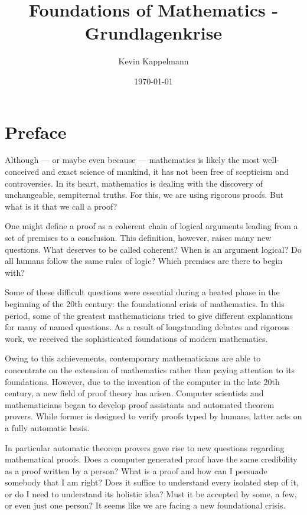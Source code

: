\documentclass[hidelinks]{article}
\title{\textbf{Foundations of Mathematics - Grundlagenkrise}}
\author{Kevin Kappelmann}
\affil{Chair for Logic and Verification,\\ Technical University of Munich}
\date{\today}
\theoremstyle{plain}
\theoremstyle{definition}
\theoremstyle{rem}
\begin{document}

\maketitle
\newpage
\section*{Preface}
Although --- or maybe even because --- mathematics is likely the most well-conceived and exact science of mankind, it has not been free of scepticism and controversies. In its heart, mathematics is dealing with the discovery of unchangeable, sempiternal truths. For this, we are using rigorous proofs. But what is it that we call a proof? 

One might define a proof as a coherent chain of logical arguments leading from a set of premises to a conclusion. This definition, however, raises many new questions. What deserves to be called coherent? When is an argument logical? Do all humans follow the same rules of logic? Which premises are there to begin with?

Some of these difficult questions were essential during a heated phase in the beginning of the 20th century: the foundational crisis of mathematics. In this period, some of the greatest mathematicians tried to give different explanations for many of named questions. As a result of longstanding debates and rigorous work, we received the sophisticated foundations of modern mathematics.

Owing to this achievements, contemporary mathematicians are able to concentrate on the extension of mathematics rather than paying attention to its foundations. However, due to the invention of the computer in the late 20th century, a new field of proof theory has arisen. Computer scientists and mathematicians began to develop proof assistants and automated theorem provers. While former is designed to verify proofs typed by humans, latter acts on a fully automatic basis.

In particular automatic theorem provers gave rise to new questions regarding mathematical proofs. Does a computer generated proof have the same credibility as a proof written by a person? What is a proof and how can I persuade somebody that I am right? Does it suffice to understand every isolated step of it, or do I need to understand its holistic idea? Must it be accepted by some, a few, or even just one person? It seems like we are facing a new foundational crisis.
\end{document}
